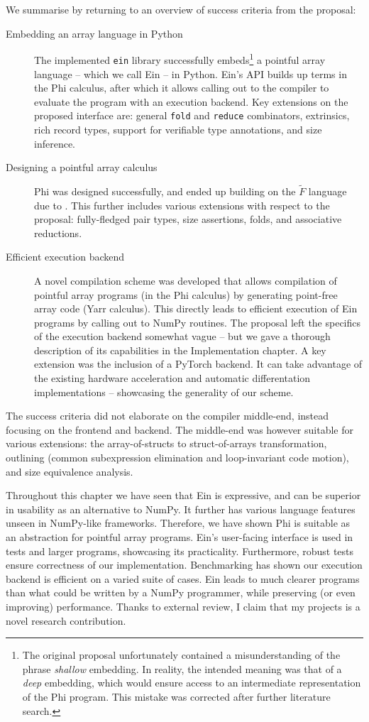 We summarise by returning to an overview of success criteria from the proposal: \begin{description}
    \item[Embedding an array language in Python] The implemented \texttt{ein} library successfully embeds\footnote{The original proposal unfortunately contained a misunderstanding of the phrase \textit{shallow} embedding. In reality, the intended meaning was that of a \textit{deep} embedding, which would ensure access to an intermediate representation of the Phi program. This mistake was corrected after further literature search.} a pointful array language -- which we call Ein -- in Python. Ein's API builds up terms in the Phi calculus, after which it allows calling out to the compiler to evaluate the program with an execution backend. Key extensions on the proposed interface are: general \texttt{fold} and \texttt{reduce} combinators, extrinsics, rich record types, support for verifiable type annotations, and size inference.
    \item[Designing a pointful array calculus] Phi was designed successfully, and ended up building on the $\tilde F$ language due to \textcite{shaikhha2019efficient}. This further includes various extensions with respect to the proposal: fully-fledged pair types, size assertions, folds, and associative reductions.
    \item[Efficient execution backend] A novel compilation scheme was developed that allows compilation of pointful array programs (in the Phi calculus) by generating point-free array code (Yarr calculus). This directly leads to efficient execution of Ein programs by calling out to NumPy routines. The proposal left the specifics of the execution backend somewhat vague -- but we gave a thorough description of its capabilities in the Implementation chapter. A key extension was the inclusion of a PyTorch backend. It can take advantage of the existing hardware acceleration and automatic differentation implementations -- showcasing the generality of our scheme.
\end{description}
The success criteria did not elaborate on the compiler middle-end, instead focusing on the frontend and backend. The middle-end was however suitable for various extensions: the array-of-structs to struct-of-arrays transformation, outlining (common subexpression elimination and loop-invariant code motion), and size equivalence analysis.

Throughout this chapter we have seen that Ein is expressive, and can be superior in usability as an alternative to NumPy. 
It further has various language features unseen in NumPy-like frameworks.
Therefore, we have shown Phi is suitable as an abstraction for pointful array programs. 
Ein's user-facing interface is used in tests and larger programs, showcasing its practicality.
Furthermore, robust tests ensure correctness of our implementation. 
Benchmarking has shown our execution backend is efficient on a varied suite of cases. 
Ein leads to much clearer programs than what could be written by a NumPy programmer, while preserving (or even improving) performance. 
Thanks to external review, I claim that my projects is a novel research contribution.
